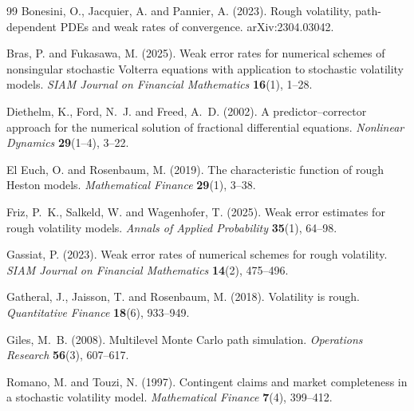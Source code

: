 \documentclass[11pt]{article}
\theoremstyle{plain}
\theoremstyle{definition}
\begin{document}
\begin{thebibliography}{99}
 Bonesini, O., Jacquier, A. and Pannier, A. (2023).
Rough volatility, path-dependent PDEs and weak rates of convergence.
arXiv:2304.03042.

 Bras, P. and Fukasawa, M. (2025).
Weak error rates for numerical schemes of nonsingular stochastic Volterra
equations with application to stochastic volatility models.
\emph{SIAM Journal on Financial Mathematics} \textbf{16}(1), 1--28.

 Diethelm, K., Ford, N.~J. and Freed, A.~D. (2002).
A predictor--corrector approach for the numerical solution of fractional differential
equations. \emph{Nonlinear Dynamics} \textbf{29}(1--4), 3--22.

 El Euch, O. and Rosenbaum, M. (2019).
The characteristic function of rough Heston models.
\emph{Mathematical Finance} \textbf{29}(1), 3--38.

 Friz, P.~K., Salkeld, W. and Wagenhofer, T. (2025).
Weak error estimates for rough volatility models.
\emph{Annals of Applied Probability} \textbf{35}(1), 64--98.

 Gassiat, P. (2023).
Weak error rates of numerical schemes for rough volatility.
\emph{SIAM Journal on Financial Mathematics} \textbf{14}(2), 475--496.

 Gatheral, J., Jaisson, T. and Rosenbaum, M. (2018).
Volatility is rough. \emph{Quantitative Finance} \textbf{18}(6), 933--949.

 Giles, M.~B. (2008).
Multilevel Monte Carlo path simulation.
\emph{Operations Research} \textbf{56}(3), 607--617.

 Romano, M. and Touzi, N. (1997).
Contingent claims and market completeness in a stochastic volatility model.
\emph{Mathematical Finance} \textbf{7}(4), 399--412.

\end{thebibliography}
\end{document}
